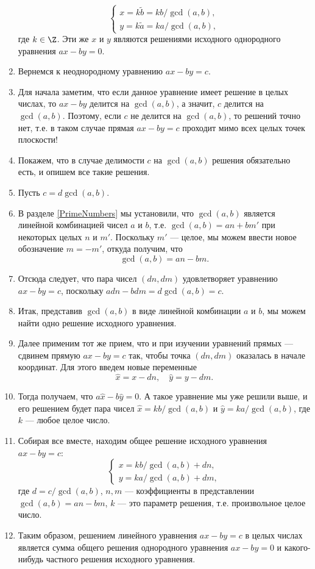 \begin{enumerate}
$$
\begin{cases}
x  =k\tilde b=kb/\gcd(a,b), \\
y  =k\tilde a=ka/\gcd(a,b),
\end{cases}
$$
где $k\in\Z$. Эти же $x$ и $y$ являются решениями исходного однородного уравнения $ax-by=0$.
\item Вернемся к неоднородному уравнению $ax-by=c$.
\item Для начала заметим, что если данное уравнение имеет решение в целых числах, то $ax-by$ делится на $\gcd(a,b)$, а значит, $c$ делится на $\gcd(a,b)$. Поэтому, если $c$ не делится на $\gcd(a,b)$, то решений точно нет, т.е. в таком случае прямая $ax-by=c$ проходит мимо всех целых точек плоскости!
\item Покажем, что в случае делимости $c$ на $\gcd(a,b)$ решения обязательно есть, и опишем все такие решения.
\item Пусть $c=d\gcd(a,b)$.
\item В разделе \ref{PrimeNumbers} мы установили, что $\gcd(a,b)$ является линейной комбинацией чисел $a$ и $b$, т.е. $\gcd(a,b) = an+bm'$ при некоторых целых $n$ и $m'$. Поскольку $m'$ --- целое, мы можем ввести новое обозначение $m=-m'$, откуда получим, что
$$
\gcd(a,b) = an-bm.
$$
\item Отсюда следует, что пара чисел $(dn,dm)$ удовлетворяет уравнению $ax-by=c$, поскольку
$adn-bdm=d\gcd(a,b)=c$.
\item Итак, представив $\gcd(a,b)$ в виде линейной комбинации $a$ и $b$, мы можем найти одно решение исходного уравнения.
\item Далее применим тот же прием, что и при изучении уравнений прямых --- сдвинем прямую $ax-by=c$ так, чтобы точка $(dn,dm)$ оказалась в начале координат. Для этого введем новые переменные
$$
\hat x = x-dn,\quad \hat y = y-dm.
$$
\item Тогда получаем, что $a\hat x-b\hat y = 0$. А такое уравнение мы уже решили выше, и его решением будет пара чисел $\hat x = kb/\gcd(a,b)$ и $\hat y = ka/\gcd(a,b)$, где $k$ --- любое целое число.
\item Собирая все вместе, находим общее решение исходного уравнения $ax-by=c$:
$$
\begin{cases}
x  = kb/\gcd(a,b) + dn, \\
y  = ka/\gcd(a,b) + dm,
\end{cases}
$$
где $d=c/\gcd(a,b)$, $n,m$ --- коэффициенты в представлении $\gcd(a,b)=an-bm$, $k$ --- это параметр решения, т.е. произвольное целое число.
\item Таким образом, решением линейного уравнения $ax-by=c$ в целых числах является сумма общего решения однородного уравнения $ax-by=0$ и какого-нибудь частного решения исходного уравнения.


\end{enumerate}
